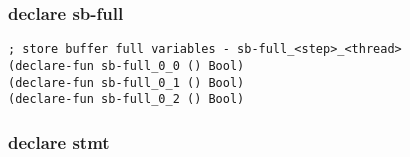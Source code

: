 \subsubsection{declare sb-full}

\begin{algorithm}[H]
\end{algorithm}

\begin{algorithm}[H]
\end{algorithm}

\begin{algorithm}[H]
\end{algorithm}

\begin{lstlisting}[language=SMTLib]
; store buffer full variables - sb-full_<step>_<thread>
(declare-fun sb-full_0_0 () Bool)
(declare-fun sb-full_0_1 () Bool)
(declare-fun sb-full_0_2 () Bool)
\end{lstlisting}

\subsubsection{declare stmt}

\begin{algorithm}[H]
\end{algorithm}

\begin{algorithm}[H]
\end{algorithm}

